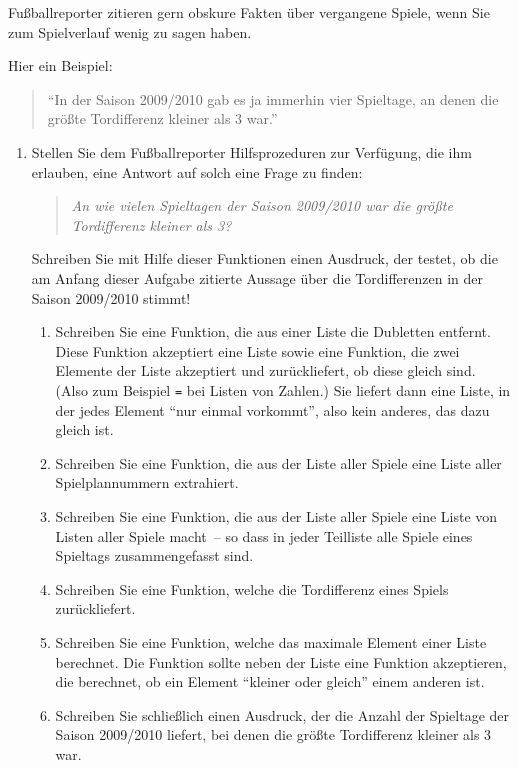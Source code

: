 \begin{aufgabe}
  Fußballreporter zitieren gern obskure Fakten über
  vergangene Spiele, wenn Sie zum Spielverlauf wenig zu sagen haben.

  Hier ein Beispiel:
  \begin{quote}
    "`In der Saison 2009/2010 gab es ja immerhin vier Spieltage, an
    denen die größte Tordifferenz kleiner als 3 war."'
  \end{quote}
\begin{enumerate}
\item Stellen Sie dem Fußballreporter Hilfsprozeduren zur Verfügung,
  die ihm erlauben, eine Antwort auf solch eine Frage zu
  finden:
  \begin{quote}
    \emph{An wie vielen Spieltagen der Saison 2009/2010 war die größte
    Tordifferenz kleiner als 3?}
  \end{quote}
  Schreiben Sie mit Hilfe dieser Funktionen einen Ausdruck, der
  testet, ob die am Anfang dieser Aufgabe zitierte Aussage über die
  Tordifferenzen in der Saison 2009/2010 stimmt!

  \begin{enumerate}
  \item Schreiben Sie eine Funktion, die aus einer Liste die Dubletten
    entfernt.  Diese Funktion akzeptiert eine Liste sowie eine
    Funktion, die zwei Elemente der Liste akzeptiert und
    zurückliefert, ob diese gleich sind.  (Also zum Beispiel
    \texttt{=} bei Listen von Zahlen.)  Sie liefert dann eine Liste,
    in der jedes Element "`nur einmal vorkommt"', also kein anderes,
    das dazu gleich ist.
  \item Schreiben Sie eine Funktion, die aus der Liste aller Spiele
    eine Liste aller Spielplannummern extrahiert.
  \item Schreiben Sie eine Funktion, die aus der Liste aller Spiele
    eine Liste von Listen aller Spiele macht~-- so dass in jeder
    Teilliste alle Spiele eines Spieltags zusammengefasst sind.
  \item Schreiben Sie eine Funktion, welche die Tordifferenz eines
    Spiels zurückliefert.
  \item Schreiben Sie eine Funktion, welche das maximale Element einer
    Liste berechnet.  Die Funktion sollte neben der Liste eine
    Funktion akzeptieren, die berechnet, ob ein Element "`kleiner oder
    gleich"' einem anderen ist.
  \item Schreiben Sie schließlich einen Ausdruck, der die Anzahl der
    Spieltage der Saison 2009/2010 liefert, bei denen die größte
    Tordifferenz kleiner als 3 war.
  \end{enumerate}


\end{enumerate}
\end{aufgabe}
